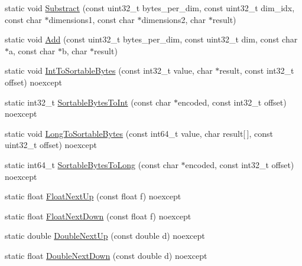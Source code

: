 \begin{DoxyCompactItemize}
static void \mbox{\hyperlink{classlucene_1_1core_1_1util_1_1numeric_1_1NumericUtils_a95837a28f8cd7df6f0f2dee82fb3563f}{Substract}} (const uint32\+\_\+t bytes\+\_\+per\+\_\+dim, const uint32\+\_\+t dim\+\_\+idx, const char $\ast$dimensions1, const char $\ast$dimensions2, char $\ast$result)
\item 
static void \mbox{\hyperlink{classlucene_1_1core_1_1util_1_1numeric_1_1NumericUtils_af46b1eb966d5889c7944e479c7d58cda}{Add}} (const uint32\+\_\+t bytes\+\_\+per\+\_\+dim, const uint32\+\_\+t dim, const char $\ast$a, const char $\ast$b, char $\ast$result)
\item 
static void \mbox{\hyperlink{classlucene_1_1core_1_1util_1_1numeric_1_1NumericUtils_a14068e73ee0e5807916069ca9d1a6717}{Int\+To\+Sortable\+Bytes}} (const int32\+\_\+t value, char $\ast$result, const int32\+\_\+t offset) noexcept
\item 
static int32\+\_\+t \mbox{\hyperlink{classlucene_1_1core_1_1util_1_1numeric_1_1NumericUtils_ab4e64bb2562706735963406bade7d4c5}{Sortable\+Bytes\+To\+Int}} (const char $\ast$encoded, const int32\+\_\+t offset) noexcept
\item 
static void \mbox{\hyperlink{classlucene_1_1core_1_1util_1_1numeric_1_1NumericUtils_a10725e2cbea0ae91ccf373396b9b97ae}{Long\+To\+Sortable\+Bytes}} (const int64\+\_\+t value, char result\mbox{[}$\,$\mbox{]}, const uint32\+\_\+t offset) noexcept
\item 
static int64\+\_\+t \mbox{\hyperlink{classlucene_1_1core_1_1util_1_1numeric_1_1NumericUtils_a75300b6ffd00df5e169d330471d47e67}{Sortable\+Bytes\+To\+Long}} (const char $\ast$encoded, const int32\+\_\+t offset) noexcept
\item 
static float \mbox{\hyperlink{classlucene_1_1core_1_1util_1_1numeric_1_1NumericUtils_ad613ebe1b53d3d3a461a549ed6ab1742}{Float\+Next\+Up}} (const float f) noexcept
\item 
static float \mbox{\hyperlink{classlucene_1_1core_1_1util_1_1numeric_1_1NumericUtils_ad3cb64d9fdf2f28dbe3ea94e57558ec5}{Float\+Next\+Down}} (const float f) noexcept
\item 
static double \mbox{\hyperlink{classlucene_1_1core_1_1util_1_1numeric_1_1NumericUtils_af4c894b25b0785ce503dd80adb5c968e}{Double\+Next\+Up}} (const double d) noexcept
\item 
static float \mbox{\hyperlink{classlucene_1_1core_1_1util_1_1numeric_1_1NumericUtils_a6718491f88ea4f131610e50fb856a95e}{Double\+Next\+Down}} (const double d) noexcept
\end{DoxyCompactItemize}
